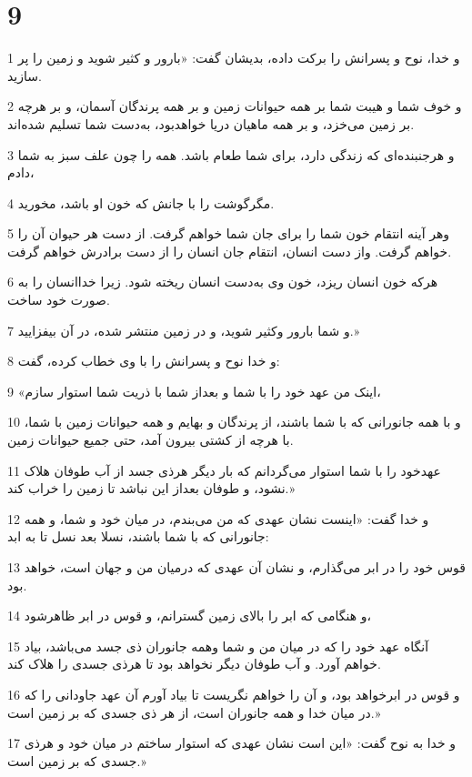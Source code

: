 \chapter{9}

\par 1 و خدا، نوح و پسرانش را برکت داده، بدیشان گفت: «بارور و کثیر شوید و زمین را پر سازید.
\par 2 و خوف شما و هیبت شما بر همه حیوانات زمین و بر همه پرندگان آسمان، و بر هرچه بر زمین می‌خزد، و بر همه ماهیان دریا خواهدبود، به‌دست شما تسلیم شده‌اند.
\par 3 و هرجنبنده‌ای که زندگی دارد، برای شما طعام باشد. همه را چون علف سبز به شما دادم،
\par 4 مگرگوشت را با جانش که خون او باشد، مخورید.
\par 5 وهر آینه انتقام خون شما را برای جان شما خواهم گرفت. از دست هر حیوان آن را خواهم گرفت. واز دست انسان، انتقام جان انسان را از دست برادرش خواهم گرفت.
\par 6 هر‌که خون انسان ریزد، خون وی به‌دست انسان ریخته شود. زیرا خداانسان را به صورت خود ساخت.
\par 7 و شما بارور وکثیر شوید، و در زمین منتشر شده، در آن بیفزایید.»
\par 8 و خدا نوح و پسرانش را با وی خطاب کرده، گفت:
\par 9 «اینک من عهد خود را با شما و بعداز شما با ذریت شما استوار سازم،
\par 10 و با همه جانورانی که با شما باشند، از پرندگان و بهایم و همه حیوانات زمین با شما، با هر‌چه از کشتی بیرون آمد، حتی جمیع حیوانات زمین.
\par 11 عهدخود را با شما استوار می‌گردانم که بار دیگر هرذی جسد از آب طوفان هلاک نشود، و طوفان بعداز این نباشد تا زمین را خراب کند.»
\par 12 و خدا گفت: «اینست نشان عهدی که من می‌بندم، در میان خود و شما، و همه جانورانی که با شما باشند، نسلا بعد نسل تا به ابد:
\par 13 قوس خود را در ابر می‌گذارم، و نشان آن عهدی که درمیان من و جهان است، خواهد بود.
\par 14 و هنگامی که ابر را بالای زمین گسترانم، و قوس در ابر ظاهرشود،
\par 15 آنگاه عهد خود را که در میان من و شما وهمه جانوران ذی جسد می‌باشد، بیاد خواهم آورد. و آب طوفان دیگر نخواهد بود تا هرذی جسدی را هلاک کند.
\par 16 و قوس در ابرخواهد بود، و آن را خواهم نگریست تا بیاد آورم آن عهد جاودانی را که در میان خدا و همه جانوران است، از هر ذی جسدی که بر زمین است.»
\par 17 و خدا به نوح گفت: «این است نشان عهدی که استوار ساختم در میان خود و هرذی جسدی که بر زمین است.»
